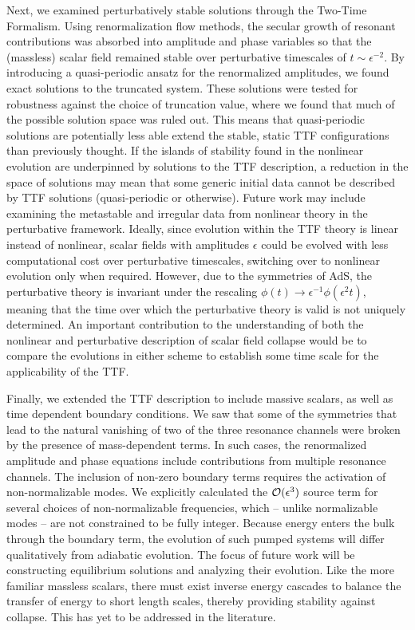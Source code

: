 \documentclass[../PhD.tex]{subfiles}
\begin{document}
Next, we examined perturbatively stable solutions through the Two-Time Formalism. Using renormalization flow methods, the secular growth of resonant contributions was absorbed into amplitude and phase variables so that the (massless) scalar field remained stable over perturbative timescales of $t \sim \epsilon^{-2}$. By introducing a quasi-periodic ansatz for the renormalized amplitudes, we found exact solutions to the truncated system. These solutions were tested for robustness against the choice of truncation value, where we found that much of the possible solution space was ruled out. This means that quasi-periodic solutions are potentially less able extend the stable, static TTF configurations than previously thought. If the islands of stability found in the nonlinear evolution are underpinned by solutions to the TTF description, a reduction in the space of solutions may mean that some generic initial data cannot be described by TTF solutions (quasi-periodic or otherwise). Future work may include examining the metastable and irregular data from nonlinear theory in the perturbative framework. Ideally, since evolution within the TTF theory is linear instead of nonlinear, scalar fields with amplitudes $\epsilon$ could be evolved with less computational cost over perturbative timescales, switching over to nonlinear evolution only when required. However, due to the symmetries of AdS, the perturbative theory is invariant under the rescaling $\phi(t) \to \epsilon^{-1} \phi (\epsilon^2 t)$, meaning that the time over which the perturbative theory is valid is not uniquely determined. An important contribution to the understanding of both the nonlinear and perturbative description of scalar field collapse would be to compare the evolutions in either scheme to establish some time scale for the applicability of the TTF. 

Finally, we extended the TTF description to include massive scalars, as well as time dependent boundary conditions. We saw that some of the symmetries that lead to the natural vanishing of two of the three resonance channels were broken by the presence of mass-dependent terms. In such cases, the renormalized amplitude and phase equations include contributions from multiple resonance channels. The inclusion of non-zero boundary terms requires the activation of non-normalizable modes. We explicitly calculated the $\mathcal O(\epsilon^3)$ source term for several choices of non-normalizable frequencies, which -- unlike normalizable modes -- are not constrained to be fully integer. Because energy enters the bulk through the boundary term, the evolution of such pumped systems will differ qualitatively from adiabatic evolution. The focus of future work will be constructing equilibrium solutions and analyzing their evolution. Like the more familiar massless scalars, there must exist inverse energy cascades to balance the transfer of energy to short length scales, thereby providing stability against collapse. This has yet to be addressed in the literature.
\end{document}
